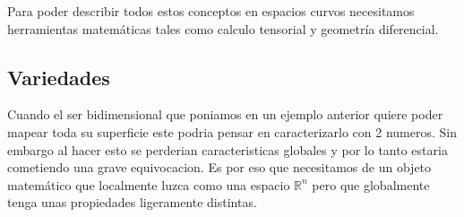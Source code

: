 \documentclass[../Main.tex]{subfiles}
\begin{document}
Para poder describir todos estos conceptos en espacios curvos necesitamos herramientas matemáticas tales como calculo tensorial y geometría diferencial.

\subsection{Variedades}\label{subsec:Variedades}
Cuando el ser bidimensional que poniamos en un ejemplo anterior quiere poder mapear toda su superficie este podria pensar en caracterizarlo con 2 numeros. Sin embargo al hacer esto se perderian caracteristicas globales y por lo tanto estaria cometiendo una grave equivocacion. Es por eso que necesitamos de un objeto matemático que localmente luzca como una espacio $\mathbb{R}^n$ pero que globalmente tenga unas propiedades ligeramente distintas.
\end{document}
